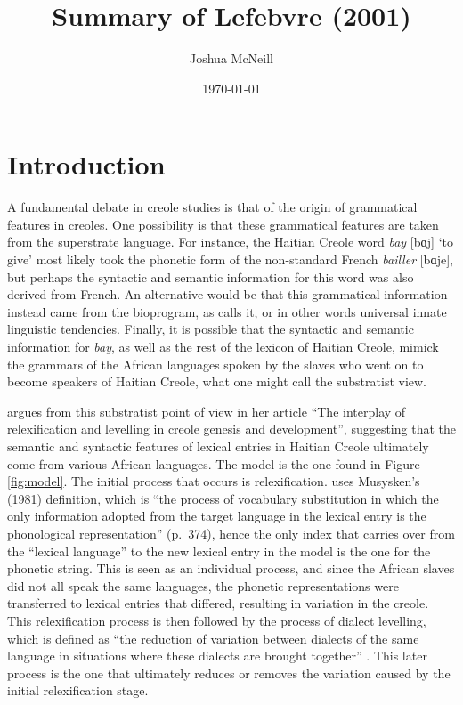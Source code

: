 \documentclass{article}
\title{Summary of Lefebvre (2001)}
\author{Joshua McNeill}
\date{\today}
\newcommand{\lexi}[1]{\textit{#1}}
\newcommand{\gloss}[1]{`#1'}
\newcommand{\shtitle}[1]{``#1''}
\begin{document}
  \maketitle
  \onehalfspacing
  \section{Introduction}
      A fundamental debate in creole studies is that of the origin of grammatical features in creoles.
      One possibility is that these grammatical features are taken from the superstrate language.
      For instance, the Haitian Creole word \lexi{bay} [bɑj] \gloss{to give} most likely took the phonetic form of the non-standard French \lexi{bailler} [bɑje], but perhaps the syntactic and semantic information for this word was also derived from French.
      An alternative would be that this grammatical information instead came from the bioprogram, as \textcite{bickerton_language_1984} calls it, or in other words universal innate linguistic tendencies.
      Finally, it is possible that the syntactic and semantic information for \lexi{bay}, as well as the rest of the lexicon of Haitian Creole, mimick the grammars of the African languages spoken by the slaves who went on to become speakers of Haitian Creole, what one might call the substratist view.

      \textcite{lefebvre_interplay_2001} argues from this substratist point of view in her article \shtitle{The interplay of relexification and levelling in creole genesis and development}, suggesting that the semantic and syntactic features of lexical entries in Haitian Creole ultimately come from various African languages.
      The model is the one found in Figure \ref{fig:model}.
      The initial process that occurs is relexification.
      \textcite{lefebvre_interplay_2001} uses Musysken's (1981) definition, which is ``the process of vocabulary substitution in which the only information adopted from the target language in the lexical entry is the phonological representation'' (p.~374), hence the only index that carries over from the ``lexical language'' to the new lexical entry in the model is the one for the phonetic string.
      This is seen as an individual process, and since the African slaves did not all speak the same languages, the phonetic representations were transferred to lexical entries that differed, resulting in variation in the creole.
      This relexification process is then followed by the process of dialect levelling, which is defined as ``the reduction of variation between dialects of the same language in situations where these dialects are brought together'' \parencite[p.~372]{lefebvre_interplay_2001}.
      This later process is the one that ultimately reduces or removes the variation caused by the initial relexification stage.
\end{document}
